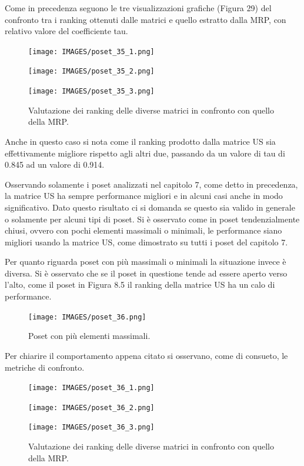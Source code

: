 \documentclass{report}
\begin{document}
Come in precedenza seguono le tre visualizzazioni grafiche (Figura 29) del confronto tra i ranking ottenuti dalle matrici e quello estratto dalla MRP, con relativo valore del coefficiente tau.

\begin{figure}[H]
  \centering
  \begin{minipage}[b]{0.4\textwidth}
    \texttt{[image: IMAGES/poset\_35\_1.png]}
  \end{minipage}
  \hfill
  \begin{minipage}[b]{0.4\textwidth}
    \texttt{[image: IMAGES/poset\_35\_2.png]}
  \end{minipage}
  \hfill
  \begin{minipage}[b]{0.4\textwidth}
    \texttt{[image: IMAGES/poset\_35\_3.png]}
  \end{minipage}
  \caption{Valutazione dei ranking delle diverse matrici in confronto con quello della MRP.}
\end{figure}

Anche in questo caso si nota come il ranking prodotto dalla matrice US sia effettivamente migliore rispetto agli altri due, passando da un valore di tau di 0.845 ad un valore di 0.914. 


Osservando solamente i poset analizzati nel capitolo 7, come detto in precedenza, la matrice US ha sempre performance migliori e in alcuni casi anche in modo significativo. Dato questo risultato ci si domanda se questo sia valido in generale o solamente per alcuni tipi di poset. Si è osservato come in poset tendenzialmente chiusi, ovvero con pochi elementi massimali o minimali, le performance siano migliori usando la matrice US, come dimostrato su tutti i poset del capitolo 7.


Per quanto riguarda poset con più massimali o minimali la situazione invece è diversa. Si è osservato che se il poset in questione tende ad essere aperto verso l'alto, come il poset in Figura 8.5 il ranking della matrice US ha un calo di performance.

\begin{figure}[H]
    \centering
    \texttt{[image: IMAGES/poset\_36.png]}
    \caption{Poset con più elementi massimali.}
    \label{fig:roc}
\end{figure}

Per chiarire il comportamento appena citato si osservano, come di consueto, le metriche di confronto.

\begin{figure}[H]
  \centering
  \begin{minipage}[b]{0.4\textwidth}
    \texttt{[image: IMAGES/poset\_36\_1.png]}
  \end{minipage}
  \hfill
  \begin{minipage}[b]{0.4\textwidth}
    \texttt{[image: IMAGES/poset\_36\_2.png]}
  \end{minipage}
  \hfill
  \begin{minipage}[b]{0.4\textwidth}
    \texttt{[image: IMAGES/poset\_36\_3.png]}
  \end{minipage}
  \caption{Valutazione dei ranking delle diverse matrici in confronto con quello della MRP.}
\end{figure}
\end{document}
